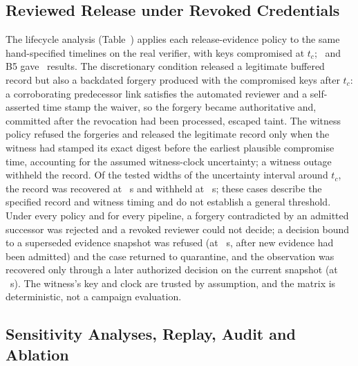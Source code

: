 \subsection{Reviewed Release under Revoked Credentials}\label{sec:res-release}

The lifecycle analysis (Table~) applies each release-evidence policy to the same hand-specified timelines on the real verifier, with keys compromised at $t_c$; \sys\ and B5 gave \WAfivePBTIBfiveSame\ results. The discretionary condition released a legitimate buffered record but also a backdated forgery produced with the compromised keys after $t_c$: a corroborating predecessor link satisfies the automated reviewer and a self-asserted time stamp the waiver, so the forgery became authoritative and, committed after the revocation had been processed, escaped taint. The witness policy refused the forgeries and released the legitimate record only when the witness had stamped its exact digest before the earliest plausible compromise time, accounting for the assumed witness-clock uncertainty; a witness outage withheld the record. Of the tested widths of the uncertainty interval around $t_c$, the record was recovered at \YEtenRecovered~s and withheld at \YEtenWithheld~s; these cases describe the specified record and witness timing and do not establish a general threshold. Under every policy and for every pipeline, a forgery contradicted by an admitted successor was rejected and a revoked reviewer could not decide; a decision bound to a superseded evidence snapshot was refused (at \YEnineRefusedAt~s, after new evidence had been admitted) and the case returned to quarantine, and the observation was recovered only through a later authorized decision on the current snapshot (at \YEnineFreshAt~s). The witness's key and clock are trusted by assumption, and the matrix is deterministic, not a campaign evaluation.

\subsection{Sensitivity Analyses, Replay, Audit and Ablation}\label{sec:res-sensitivity}


